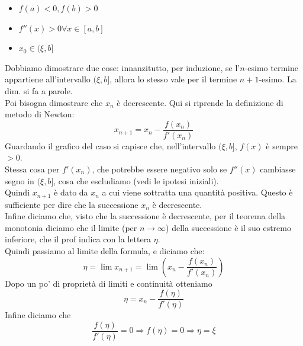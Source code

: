 \begin{itemize}
    \item $f(a)<0, f(b)>0$
    \item $f''(x)>0 \forall x \in [a,b]$
    \item $x_0 \in (\xi,b]$
\end{itemize}
Dobbiamo dimostrare due cose: innanzitutto, per induzione, se l'$n$-esimo termine appartiene all'intervallo $(\xi,b]$, allora lo stesso vale per il termine $n+1$-esimo. La dim. si fa a parole.\\
Poi bisogna dimostrare che ${x_n}$ è decrescente. Qui si riprende la definizione di metodo di Newton:
\begin{displaymath}
    x_{n+1} = x_n-\frac{f(x_n)}{f'(x_n)}
\end{displaymath}
Guardando il grafico del caso  si capisce che, nell'intervallo $(\xi,b]$, $f(x)$ è sempre $>0$.\\
Stessa cosa per $f'(x_n)$, che potrebbe essere negativo solo se $f''(x)$ cambiasse segno in $(\xi,b]$, cosa che escludiamo (vedi le ipotesi iniziali).\\
Quindi $x_{n+1}$ è dato da $x_n$ a cui viene sottratta una quantità positiva. Questo è sufficiente per dire che la successione ${x_n}$ è decrescente.\\
Infine diciamo che, visto che la successione è decrescente, per il teorema della monotonia diciamo che il limite (per $n\rightarrow \infty$) della successione è il suo estremo inferiore, che il prof indica con la lettera $\eta$.\\
Quindi passiamo al limite della formula, e diciamo che:
\begin{displaymath}
    \eta=\lim_{}x_{n+1}=\lim_{}\left ( x_n-\frac{f(x_n)}{f'(x_n)} \right )
\end{displaymath}
Dopo un po' di proprietà di limiti e continuità otteniamo
\begin{displaymath}
    \eta= x_n-\frac{f(\eta)}{f'(\eta)}
\end{displaymath}
Infine diciamo che
\begin{displaymath}
    \frac{f(\eta)}{f'(\eta)}=0 \Rightarrow f(\eta)=0\Rightarrow \eta = \xi
\end{displaymath}

